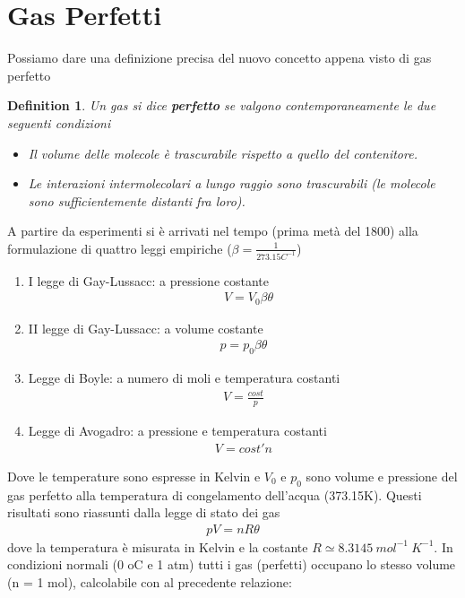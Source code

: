 \documentclass[10pt,a4paper]{article}
\newtheorem{definition}{Definition}
\begin{document}
\section{Gas Perfetti}
Possiamo dare una definizione precisa del nuovo concetto appena visto di gas perfetto
\begin{definition}
Un gas si dice \textbf{perfetto} se valgono contemporaneamente le due seguenti condizioni
\begin{itemize}
\item Il volume delle molecole è trascurabile rispetto a quello del contenitore.
\item Le interazioni intermolecolari a lungo raggio sono trascurabili (le molecole sono sufficientemente distanti fra loro). 
\end{itemize}
\end{definition}
A partire da esperimenti si è arrivati nel tempo (prima metà del 1800) alla formulazione di quattro leggi empiriche ($\beta = \frac{1}{273.15 C^{-1}}$)
\begin{enumerate}
\item I legge di Gay-Lussacc: a pressione costante
 \begin{align*}
 &V = V_0 \beta \theta
\end{align*}
\item II legge di Gay-Lussacc: a volume costante
\begin{align*}
	p = p_0 \beta \theta
\end{align*}
\item Legge di Boyle: a numero di moli e temperatura costanti
\begin{align*}
 V = \frac{cost}{p}
\end{align*}
\item Legge di Avogadro: a pressione e temperatura costanti
\begin{align*}
	V = cost' n
\end{align*}
\end{enumerate}
Dove le temperature sono espresse in Kelvin e $V_0$ e $p_0$ sono volume e pressione del gas perfetto alla temperatura di congelamento dell'acqua (373.15\textdegree K). Questi risultati sono riassunti dalla legge di stato dei gas
\begin{align}\label{eq:gaseperfetti}
	pV = nR\theta
\end{align}
dove la temperatura è misurata in Kelvin e la costante $R\simeq 8.3145\ mol^{-1}\ K^{-1}$. In condizioni normali (0 oC e 1 atm) tutti i gas (perfetti) occupano lo stesso volume (n = 1 mol), calcolabile con al precedente relazione:
\end{document}
